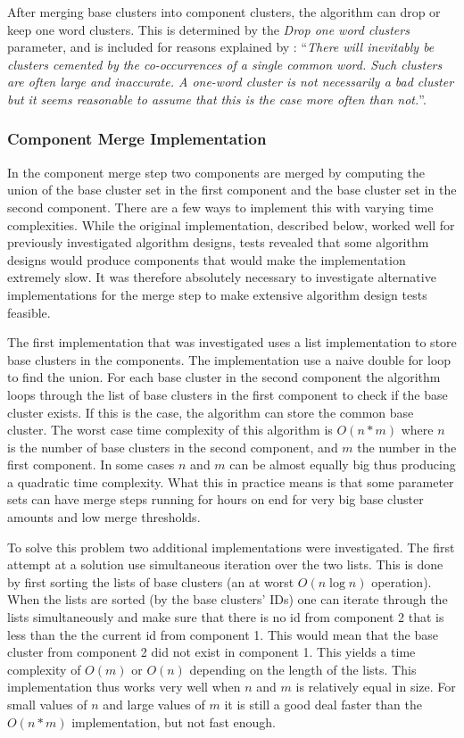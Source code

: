 After merging base clusters into component clusters, the algorithm can drop or keep one word clusters. This is determined by the \emph{Drop one word clusters} parameter, and is included for reasons explained by \cite[][664]{Moe2014}: ``\textit{There will inevitably be clusters cemented by the co-occurrences of a single common word. Such clusters are often large and inaccurate. A one-word cluster is not necessarily a bad cluster but it seems reasonable to assume that this is the case more often than not.}''.

\subsubsection{Component Merge Implementation}
\label{subsubsec:componentmerge}
In the component merge step two components are merged by computing the union of the base cluster set in the first component and the base cluster set in the second component. There are a few ways to implement this with varying time complexities. While the original implementation, described below, worked well for previously investigated algorithm designs, tests revealed that some algorithm designs would produce components that would make the implementation extremely slow. It was therefore absolutely necessary to investigate alternative implementations for the merge step to make extensive algorithm design tests feasible.

The first implementation that was investigated uses a list implementation to store base clusters in the components. The implementation use a naive double for loop to find the union. For each base cluster in the second component the algorithm loops through the list of base clusters in the first component to check if the base cluster exists. If this is the case, the algorithm can store the common base cluster. The worst case time complexity of this algorithm is \(O(n*m)\) where \(n\) is the number of base clusters in the second component, and \(m\) the number in the first component. In some cases \(n\) and \(m\) can be almost equally big thus producing a quadratic time complexity. What this in practice means is that some parameter sets can have merge steps running for hours on end for very big base cluster amounts and low merge thresholds.

To solve this problem two additional implementations were investigated. The first attempt at a solution use simultaneous iteration over the two lists. This is done by first sorting the lists of base clusters (an at worst \(O(n \log n)\) operation). When the lists are sorted (by the base clusters' IDs) one can iterate through the lists simultaneously and make sure that there is no id from component 2 that is less than the the current id from component 1. This would mean that the base cluster from component 2 did not exist in component 1. This yields a time complexity of \(O(m)\) or \(O(n)\) depending on the length of the lists. This implementation thus works very well when \(n\) and \(m\) is relatively equal in size. For small values of \(n\) and large values of \(m\) it is still a good deal faster than the \(O(n*m)\) implementation, but not fast enough.

